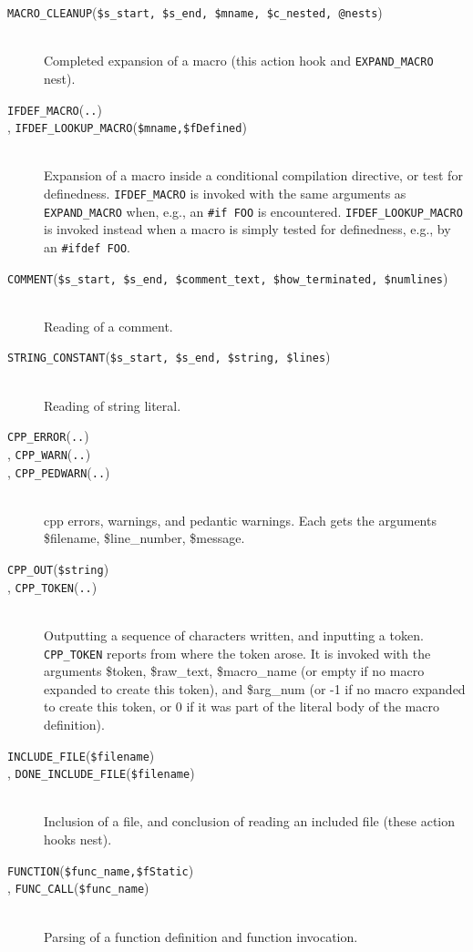 \documentclass{article}
\newcommand{\Cpp}{\mbox{\textsf{cpp}}}
\newcommand{\hook}[2]{\texttt{#1}(\texttt{#2}) \\ }
\newcommand{\shook}[1]{\texttt{#1}}
\newcommand{\ppd}[1]{\texttt{\##1}}
\begin{document}
\begin{description}
\item[\hook{MACRO\_CLEANUP}{\$s\_\-start, \$s\_\-end, \$mname, \$c\_\-nested, @nests}] ~ \\
  Completed expansion of a macro (this action hook and \shook{EXPAND\_MACRO} nest).

\item[\hook{IFDEF\_MACRO}{..}, \hook{IFDEF\_LOOKUP\_MACRO}{\$mname,\$fDefined}] ~ \\
  Expansion of a macro inside a conditional compilation
  directive, or test for definedness.  \shook{IFDEF\_MACRO} is invoked
  with the same arguments as \shook{EXPAND\_\-MACRO} when, e.g., an
  \ppd{if FOO} is encountered.  \shook{IFDEF\_LOOKUP\_MACRO} is invoked
  instead when a macro is simply tested for definedness, e.g., by an
  \ppd{ifdef FOO}.

\item[\hook{COMMENT}{\$s\_\-start, \$s\_\-end, \$comment\_\-text, 
        \$how\_\-terminated, \$num\-lines}] ~ \\
  Reading of a comment.

\item[\hook{STRING\_\-CONSTANT}{\$s\_\-start, \$s\_\-end, \$string, \$lines}] ~ \\
  Reading of string literal.

\item[\hook{CPP\_ERROR}{..}, \hook{CPP\_WARN}{..}, \hook{CPP\_PEDWARN}{..}] ~ \\
  \Cpp{} errors, warnings, and pedantic warnings.  Each gets the
  arguments \$filename, \$line\_\-number, \$message.

\item[\hook{CPP\_OUT}{\$string}, \hook{CPP\_TOKEN}{..}] ~ \\
  Outputting a sequence of characters written, and inputting a token.
  \shook{CPP\_TOKEN} reports from where the token arose.  
  It is invoked with the arguments \$token, \$raw\_\-text, \$macro\_\-name
  (or empty if no macro expanded to create this token), and \$arg\_\-num
  (or -1 if no macro expanded to create this token, or 0 if it was part
  of the literal body of the macro definition).

\item[\hook{INCLUDE\_FILE}{\$filename}, \hook{DONE\_INCLUDE\_FILE}{\$filename}] ~ \\
  Inclusion of a file, and conclusion of reading an included file (these
  action hooks nest).

\item[\hook{FUNCTION}{\$func\_\-name,\$fStatic}, \hook{FUNC\_CALL}{\$func\_\-name}] ~ \\
  Parsing of a function definition and function invocation.


\end{description}
\end{document}
